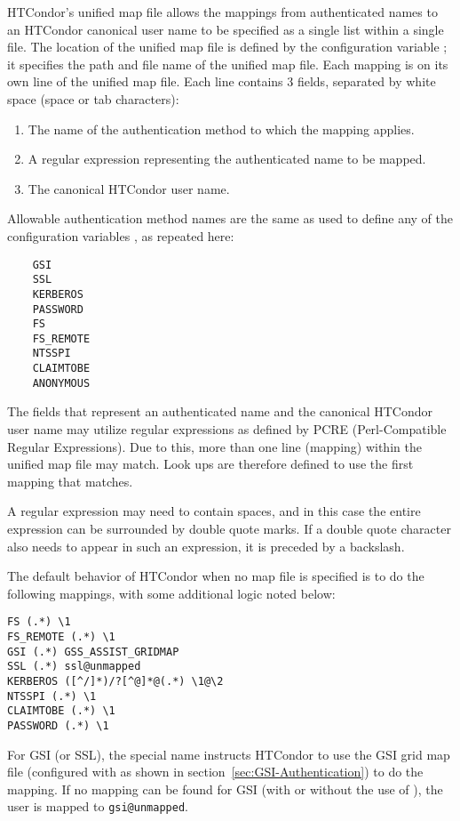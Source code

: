 HTCondor's unified map file allows the mappings
from authenticated names to an HTCondor canonical user name
to be specified as a single list within a single file. 
The location of the unified map file is defined 
by the configuration variable
; it specifies the
path and file name of the unified map file.
Each mapping is on its own line of the unified map file.
Each line contains 3 fields, separated by white space 
(space or tab characters):
\begin{enumerate}
\item{The name of the authentication method to which the mapping applies.}
\item{A regular expression representing the authenticated name
to be mapped.}
\item{The canonical HTCondor user name.}
\end{enumerate}

Allowable authentication method names are the same as used to define
any of the configuration variables ,
as repeated here:
\begin{verbatim}
    GSI
    SSL
    KERBEROS
    PASSWORD
    FS
    FS_REMOTE
    NTSSPI
    CLAIMTOBE
    ANONYMOUS
\end{verbatim}

The fields that represent an authenticated name and the canonical
HTCondor user name may utilize regular expressions as defined 
by PCRE (Perl-Compatible Regular Expressions).
Due to this, more than one line (mapping) within the unified
map file may match.
Look ups are therefore defined to use the first mapping that
matches.

A regular expression may need to contain spaces, and in this case the
entire expression can be surrounded by double quote marks. If a
double quote character also needs to appear in such an expression, it
is preceded by a backslash.

The default behavior of HTCondor when no map file is specified is to
do the following mappings, with some additional logic noted below:
\begin{verbatim}
FS (.*) \1
FS_REMOTE (.*) \1
GSI (.*) GSS_ASSIST_GRIDMAP
SSL (.*) ssl@unmapped
KERBEROS ([^/]*)/?[^@]*@(.*) \1@\2
NTSSPI (.*) \1
CLAIMTOBE (.*) \1
PASSWORD (.*) \1
\end{verbatim}

For GSI (or SSL), the special name  instructs 
HTCondor to use the GSI grid map file (configured with 
as shown in section~\ref{sec:GSI-Authentication}) to do the mapping.
If no mapping can be found for GSI (with or without the use of
), the user is mapped to \verb|gsi@unmapped|.

